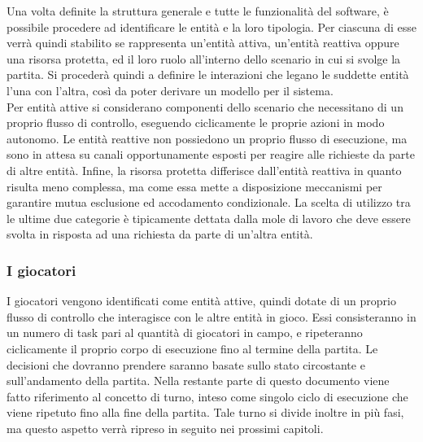 Una volta definite la struttura generale e tutte le funzionalità del software, è possibile procedere ad identificare le entità e la loro tipologia. Per ciascuna di esse verrà quindi stabilito se rappresenta un'entità attiva, un'entità reattiva oppure una risorsa protetta, ed il loro ruolo all'interno dello scenario in cui si svolge la partita. Si procederà quindi a definire le interazioni che legano le suddette entità l'una con l'altra, così da poter derivare un modello per il sistema.\\

Per entità attive si considerano componenti dello scenario che necessitano di un proprio flusso di controllo, eseguendo ciclicamente le proprie azioni in modo autonomo. Le entità reattive non possiedono un proprio flusso di esecuzione, ma sono in attesa su canali opportunamente esposti per reagire alle richieste da parte di altre entità. Infine, la risorsa protetta differisce dall'entità reattiva in quanto risulta meno complessa, ma come essa mette a disposizione meccanismi per garantire mutua esclusione ed accodamento condizionale. La scelta di utilizzo tra le ultime due categorie è tipicamente dettata dalla mole di lavoro che deve essere svolta in risposta ad una richiesta da parte di un'altra entità.

\subsubsection{I giocatori}
\label{sec:entita_coinvolte_giocatori}

I giocatori vengono identificati come entità attive, quindi dotate di un proprio flusso di controllo che interagisce con le altre entità in gioco. Essi consisteranno in un numero di task pari al quantità di giocatori in campo, e ripeteranno ciclicamente il proprio corpo di esecuzione fino al termine della partita. Le decisioni che dovranno prendere saranno basate sullo stato circostante e sull'andamento della partita. Nella restante parte di questo documento viene fatto riferimento al concetto di turno, inteso come singolo ciclo di esecuzione che viene ripetuto fino alla fine della partita. Tale turno si divide inoltre in più fasi, ma questo aspetto verrà ripreso in seguito nei prossimi capitoli.

%

